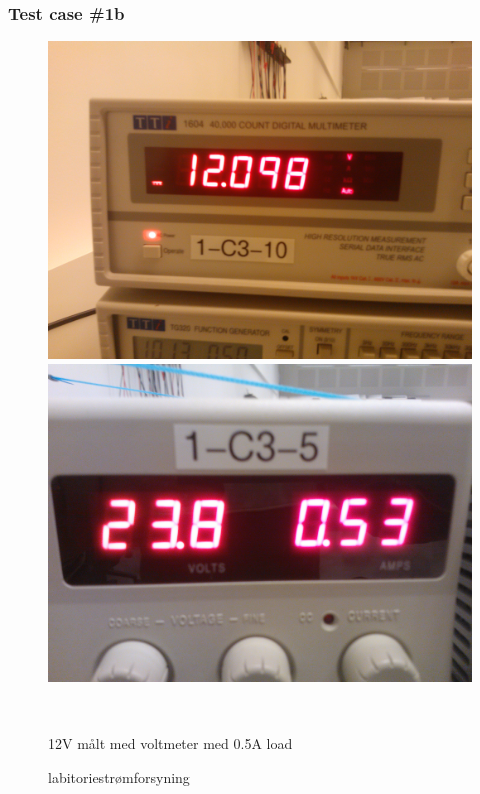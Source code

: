 \subsubsection{Test case \#1b}
\begin{figure}[htbp] \centering
\begin{minipage}[c]{0.48\textwidth} \centering
\includegraphics[width=1.00\textwidth]{billeder/12V_05A_meter.jpg} 
\end{minipage} \hfill
\begin{minipage}[c]{0.48\textwidth} \centering
\includegraphics[width=1.00\textwidth]{billeder/12V_05A_power.jpg} 
\end{minipage} \\ 
\begin{minipage}[t]{0.48\textwidth}
\caption{12V målt med voltmeter med 0.5A load} 
\label{fig:udgang_12V_05A}
\end{minipage} \hfill
\begin{minipage}[t]{0.48\textwidth}
\caption{labitoriestrømforsyning} 
\label{fig:forsyning_12V_05A}
\end{minipage}
\end{figure}
